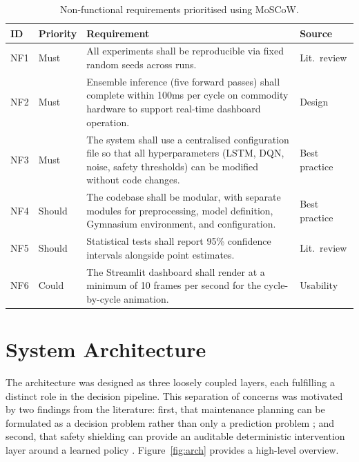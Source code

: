 \documentclass[12pt,a4paper]{report}
\begin{document}
\begin{table}[h]
\centering
\small
\caption{Non-functional requirements prioritised using MoSCoW.}
\label{tab:nonfunc_req}
\renewcommand{\arraystretch}{1.3}
\setlength{\tabcolsep}{4pt}
\begin{tabularx}{\textwidth}{@{}>{\raggedright\arraybackslash}p{0.8cm} >{\raggedright\arraybackslash}p{1.55cm} >{\raggedright\arraybackslash}X >{\raggedright\arraybackslash}p{1.60cm}@{}}
\toprule
\textbf{ID} & \textbf{Priority} & \textbf{Requirement} & \textbf{Source} \\
\midrule
NF1 & Must & All experiments shall be reproducible via fixed random seeds across runs. & Lit.~review \\
NF2 & Must & Ensemble inference (five forward passes) shall complete within 100ms per cycle on commodity hardware to support real-time dashboard operation. & Design \\
NF3 & Must & The system shall use a centralised configuration file so that all hyperparameters (LSTM, DQN, noise, safety thresholds) can be modified without code changes. & Best practice \\
NF4 & Should & The codebase shall be modular, with separate modules for preprocessing, model definition, Gymnasium environment, and configuration. & Best practice \\
NF5 & Should & Statistical tests shall report 95\% confidence intervals alongside point estimates. & Lit.~review \\
NF6 & Could & The Streamlit dashboard shall render at a minimum of 10 frames per second for the cycle-by-cycle animation. & Usability \\
\bottomrule
\end{tabularx}
\end{table}

\section{System Architecture}

The architecture was designed as three loosely coupled layers, each fulfilling a distinct role in the decision pipeline. This separation of concerns was motivated by two findings from the literature: first, that maintenance planning can be formulated as a decision problem rather than only a prediction problem \citep{zhang2019deep, lee2023deep}; and second, that safety shielding can provide an auditable deterministic intervention layer around a learned policy \citep{alshiekh2018safe}. Figure~\ref{fig:arch} provides a high-level overview.
\end{document}
